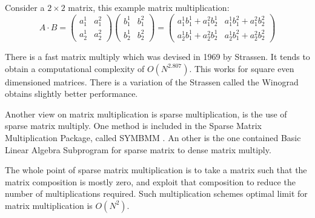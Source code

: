 Consider a $2 \times 2$ matrix, this example matrix multiplication:
\begin{equation}\displaystyle
\label{eqn:conventional}
A \cdot B = 
\left(\begin{array}{cc}  a^1_1&  a^2_1 \\ a^1_2 &  a^2_2 \end{array}\right)
\left(\begin{array}{cc}  b^1_1&  b^2_1 \\ b^1_2 &  b^2_2 \end{array}\right) =
\left(\begin{array}{cc}  a^1_{1} b^1_{1} + a^2_{1} b^1_{2}&  a^1_{1}b^2_{1} + a^2_{1}  b^2_{2}    \\ a^1_{2} b^1_{1} + a^2_{2} b^1_{2} &  a^1_{2} b^2_{1} + a^2_{2} b^2_{2} 
\end{array}\right)
\end{equation}


There is a fast matrix multiply which was devised in 1969 by  Strassen.  It tends to obtain a computational complexity of $O(N^{2.807})$.  This works for square even dimensioned matrices.  There is a variation of the Strassen called the Winograd obtains slightly better performance.  \cite{lederman}

Another view on matrix multiplication is sparse multiplication, is the use of sparse matrix multiply.  One method is included in the Sparse Matrix Multiplication Package, called SYMBMM \cite {bank}. An other is the one contained Basic Linear Algebra Subprogram for sparse matrix to dense matrix multiply.  

The whole point of sparse matrix multiplication is to take a matrix such that the matrix composition is mostly zero, and exploit that composition to reduce the number of multiplications required.  Such multiplication schemes optimal limit for matrix multiplication is $O(N^2)$.  







